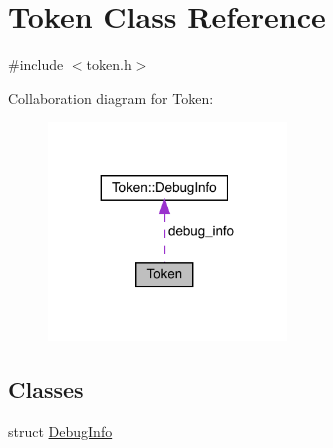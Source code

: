 \hypertarget{class_token}{}\section{Token Class Reference}
\label{class_token}


{\ttfamily \#include $<$token.\+h$>$}



Collaboration diagram for Token\+:
\nopagebreak
\begin{figure}[H]
\begin{center}
\leavevmode
\includegraphics[width=179pt]{class_token__coll__graph}
\end{center}
\end{figure}
\subsection*{Classes}
\begin{DoxyCompactItemize}
\item 
struct \hyperlink{struct_token_1_1_debug_info}{Debug\+Info}
\end{DoxyCompactItemize}
